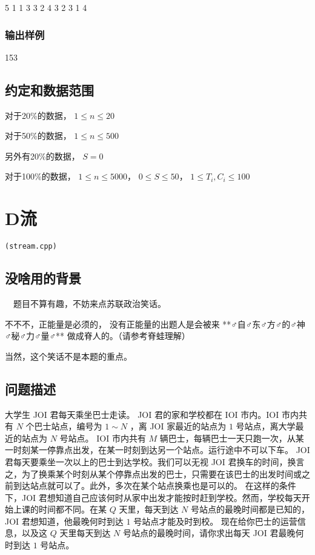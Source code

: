 \documentclass[UTF8]{ctexart}
\begin{document}
5
1
1 3
3 2
4 3
2 3
1 4

\subsubsection{输出样例}

153


\subsection{约定和数据范围}

对于20\%的数据， $1\le n\le 20$

对于50\%的数据， $1\le n\le 500$

另外有20\%的数据， $S=0$

对于100\%的数据， $1\le n\le 5000$， $0\le S\le 50$， $1\le T_i,C_i\le 100$

\newpage
\section{D流}
\begin{center}
\tt\large{(stream.cpp)}
\end{center}

\subsection{没啥用的背景}

~~题目不算有趣，不妨来点苏联政治笑话。~~

不不不，正能量是必须的， 没有正能量的出题人是会被来 **♂自♂东♂方♂的♂神♂秘♂力♂量♂** 做成脊人的。（请参考脊蛙理解）

当然，这个笑话不是本题的重点。

\subsection{问题描述}

大学生 JOI 君每天乘坐巴士走读。
JOI 君的家和学校都在 IOI 市内。IOI 市内共有 $N$ 个巴士站点，编号为 $1\sim N$ ，离 JOI 家最近的站点为 $1$ 号站点，离大学最近的站点为 $N$ 号站点。
IOI 市内共有 $M$ 辆巴士，每辆巴士一天只跑一次，从某一时刻某一停靠点出发，在某一时刻到达另一个站点。运行途中不可以下车。
JOI 君每天要乘坐一次以上的巴士到达学校。我们可以无视 JOI 君换车的时间，换言之，为了换乘某个时刻从某个停靠点出发的巴士，只需要在该巴士的出发时间或之前到达站点就可以了。此外，多次在某个站点换乘也是可以的。
在这样的条件下，JOI 君想知道自己应该何时从家中出发才能按时赶到学校。然而，学校每天开始上课的时间都不同。在某 $Q$ 天里，每天到达 $N$ 号站点的最晚时间都是已知的，JOI 君想知道，他最晚何时到达 $1$ 号站点才能及时到校。
现在给你巴士的运营信息，以及这 $Q$ 天里每天到达 $N$ 号站点的最晚时间，请你求出每天 JOI 君最晚何时到达 $1$ 号站点。
\end{document}

